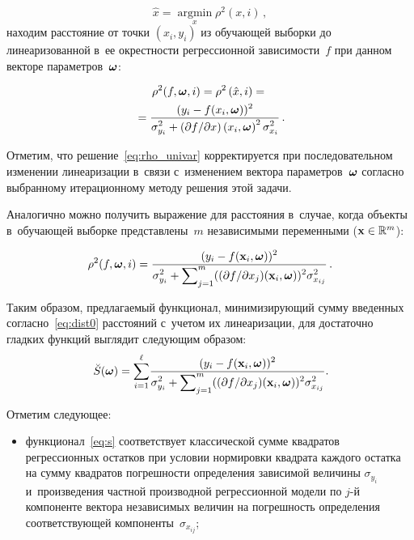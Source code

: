 \begin{multicols}{2}
\noindent
$$
  \hat{x} = \mathop{\arg \min}\limits_x \rho^2(x, i)\,,
$$
находим расстояние от точки $(x_i, y_i)$ из обуча\-ющей выборки до
линеаризованной в~ее окрест\-ности регрессионной за\-ви\-си\-мости~$f$ при
данном векторе па\-ра\-мет\-ров~$\boldsymbol{\omega}$:

\noindent
\begin{multline}
  \rho^2(f, \boldsymbol{\omega}, i) = \rho^2\left(\hat{x}, i\right) = {}\\
  {}=\displaystyle\frac{\displaystyle (y_i - f(x_i, 
\boldsymbol{\omega}))^2\mathstrut}{\displaystyle \sigma^2_{y_i} + ({\partial f}/{\partial x})\left(x_i, \boldsymbol{\omega}\right)^2 
\sigma^2_{x_i}\mathstrut}\,.
  \label{eq:rho_univar}
\end{multline}

Отметим, что решение~\eqref{eq:rho_univar} корректируется при
последовательном изменении линеаризации в~связи с~изменением вектора
па\-ра\-мет\-ров~$\boldsymbol{\omega}$ согласно выбранному итерационному методу решения
этой задачи.

Аналогично можно получить выражение для расстояния в~случае, когда объекты 
в~обучающей выборке представлены~$m$ независимыми переменными ($\mathbf{x}
\hm \in \mathbb{R}^m$):

\noindent
$$
  \rho^2(f, \boldsymbol{\omega}, i) = \displaystyle\frac{\displaystyle (y_i - f(\mathbf{x}_i, 
\boldsymbol{\omega}))^2\mathstrut}{\displaystyle \sigma_{y_i}^2 + \sum\nolimits_{j = 1}^m (({\partial f}/{\partial 
x_j})(\mathbf{x}_i, \boldsymbol{\omega}))^2 \sigma^2_{x_{ij}}\mathstrut}\,.
$$

Таким образом, предлагаемый функционал, ми\-ни\-ми\-зи\-ру\-ющий сумму введенных
со\-глас\-но~\eqref{eq:dist0} рас\-сто\-яний с~учетом их линеаризации,
для достаточно глад\-ких функций выглядит следующим образом:
\begin{equation}
  \breve{S}(\boldsymbol{\omega}) = \sum\limits_{i = 1}^\ell\! \displaystyle\frac{\displaystyle (y_i - f(\mathbf{x}_i, 
\boldsymbol{\omega}))^2\mathstrut}{\displaystyle \sigma_{y_i}^2 + \sum\nolimits_{j = 1}^m (({\partial f}/{\partial 
x_j})(\mathbf{x}_i, \boldsymbol{\omega}))^2 \sigma^2_{x_{ij}}\mathstrut}.\!
  \label{eq:s}
\end{equation}

Отметим следующее:
\begin{itemize}
  \item функционал~\eqref{eq:s} соответствует классической сумме квад\-ра\-тов 
регрессионных     остат\-ков при условии нормировки 
квад\-ра\-та каждого остатка на сумму 
квад\-ра\-тов по\-греш\-ности
    определения зависимой величины $\sigma_{y_i}$ и~произведения част\-ной 
производной     регрессионной модели по \mbox{$j$-й} компоненте вектора независимых величин на 
по\-греш\-ность     определения соответствующей компоненты~$\sigma_{x_{ij}}$;


\end{itemize}
\end{multicols}
